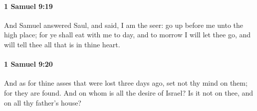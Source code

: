		\paragraph{1 Samuel 9:19} %
			\label{1SAMUEL-9-19}

			And Samuel answered Saul, and said, I am the seer: go up before me unto the high place; for ye shall eat with me to day, and to morrow I will let thee go, and will tell thee all that is in thine heart.


		\paragraph{1 Samuel 9:20} %
			\label{1SAMUEL-9-20}

			And as for thine asses that were lost three days ago, set not thy mind on them; for they are found. And on whom is all the desire of Israel? Is it not on thee, and on all thy father’s house?

